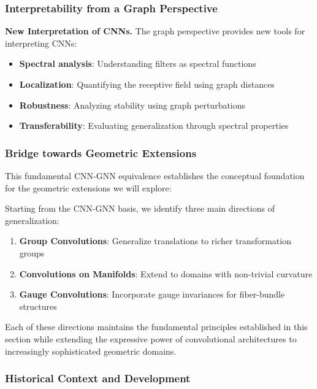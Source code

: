 \subsubsection{Interpretability from a Graph Perspective}

\textbf{New Interpretation of CNNs.} The graph perspective provides new tools for interpreting \glspl{CNN}:
\begin{itemize}
    \item \textbf{Spectral analysis}: Understanding filters as spectral functions
    \item \textbf{Localization}: Quantifying the receptive field using graph distances
    \item \textbf{Robustness}: Analyzing stability using graph perturbations
    \item \textbf{Transferability}: Evaluating generalization through spectral properties
\end{itemize}

\subsubsection{Bridge towards Geometric Extensions}

This fundamental \gls{CNN}-\gls{GNN} equivalence establishes the conceptual foundation for the geometric extensions we will explore:

\begin{definition}\label{def:taxonomia_extensiones}
Starting from the CNN-GNN basis, we identify three main directions of generalization:
\begin{enumerate}
    \item \textbf{Group Convolutions}: Generalize translations to richer transformation groups
    \item \textbf{Convolutions on Manifolds}: Extend to domains with non-trivial curvature
    \item \textbf{Gauge Convolutions}: Incorporate gauge invariances for fiber-bundle structures
\end{enumerate}
\end{definition}

Each of these directions maintains the fundamental principles established in this section while extending the expressive power of convolutional architectures to increasingly sophisticated geometric domains.

\subsubsection{Historical Context and Development}

